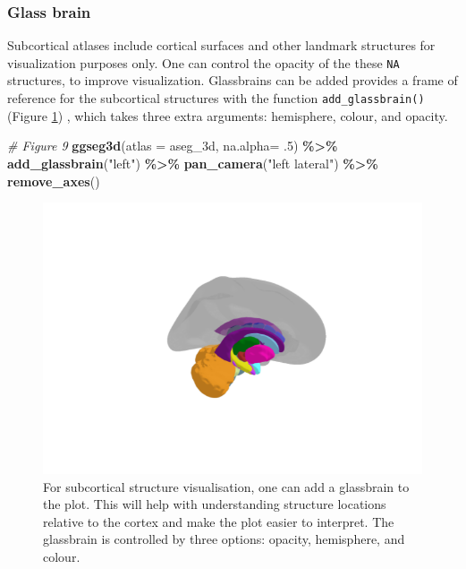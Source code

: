 \documentclass[fleqn,10pt]{wlpeerj} %
\newenvironment{Shaded}{\begin{snugshade}}{\end{snugshade}}
\newcommand{\CommentTok}[1]{\textcolor[rgb]{0.56,0.35,0.01}{\textit{#1}}}
\newcommand{\DataTypeTok}[1]{\textcolor[rgb]{0.13,0.29,0.53}{#1}}
\newcommand{\FloatTok}[1]{\textcolor[rgb]{0.00,0.00,0.81}{#1}}
\newcommand{\KeywordTok}[1]{\textcolor[rgb]{0.13,0.29,0.53}{\textbf{#1}}}
\newcommand{\NormalTok}[1]{#1}
\newcommand{\OperatorTok}[1]{\textcolor[rgb]{0.81,0.36,0.00}{\textbf{#1}}}
\newcommand{\StringTok}[1]{\textcolor[rgb]{0.31,0.60,0.02}{#1}}
\begin{document}
\hypertarget{glass-brain}{%
\subsubsection{Glass brain}\label{glass-brain}}

Subcortical atlases include cortical surfaces and other landmark structures for visualization purposes only.
One can control the opacity of the these \texttt{NA} structures, to improve visualization.
Glassbrains can be added provides a frame of reference for the subcortical structures with the function \texttt{add\_glassbrain()} (Figure \ref{fig:glassbrain1}) , which takes three extra arguments: hemisphere, colour, and opacity.

\begin{Shaded}
\begin{Highlighting}[]
\CommentTok{\# Figure 9}
\KeywordTok{ggseg3d}\NormalTok{(}\DataTypeTok{atlas =}\NormalTok{ aseg\_3d,}
        \DataTypeTok{na.alpha=} \FloatTok{.5}\NormalTok{) }\OperatorTok{\%>\%}\StringTok{   }
\StringTok{  }\KeywordTok{add\_glassbrain}\NormalTok{(}\StringTok{"left"}\NormalTok{) }\OperatorTok{\%>\%}\StringTok{ }
\StringTok{  }\KeywordTok{pan\_camera}\NormalTok{(}\StringTok{"left lateral"}\NormalTok{) }\OperatorTok{\%>\%}\StringTok{ }
\StringTok{  }\KeywordTok{remove\_axes}\NormalTok{()}
\end{Highlighting}
\end{Shaded}

\begin{figure}[H]
\includegraphics[width=0.6\linewidth]{png/ggseg3d_glass} \caption{For subcortical structure visualisation, one can add a glassbrain to the plot. This will help with understanding structure locations relative to the cortex and make the plot easier to interpret. The glassbrain is controlled by three options: opacity, hemisphere, and colour.}\label{fig:glassbrain1}
\end{figure}
\end{document}
